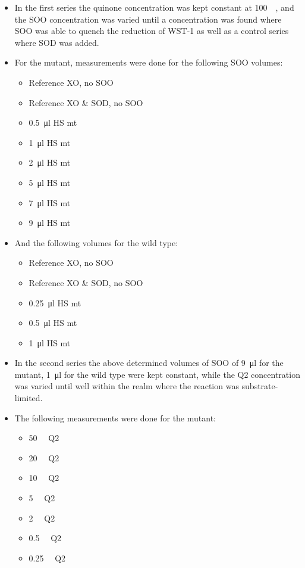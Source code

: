 \begin{itemize}
	\item In the first series the quinone concentration was kept constant
		at \SI{100}{\micro\Molar}, and the SOO concentration was varied
		until a concentration was found where SOO was able to quench
		the reduction of WST-1 as well as a control series where SOD
		was added.
	\item For the mutant, measurements were done for the following SOO
		volumes:
		\begin{itemize}
			\item Reference XO, no SOO
			\item Reference XO \& SOD, no SOO
			\item \SI{0.5}{\ul} HS mt
			\item \SI{1}{\ul} HS mt
			\item \SI{2}{\ul} HS mt
			\item \SI{5}{\ul} HS mt
			\item \SI{7}{\ul} HS mt
			\item \SI{9}{\ul} HS mt
		\end{itemize}
	\item And the following volumes for the wild type:
		\begin{itemize}
			\item Reference XO, no SOO
			\item Reference XO \& SOD, no SOO
			\item \SI{0.25}{\ul} HS mt
			\item \SI{0.5}{\ul} HS mt
			\item \SI{1}{\ul} HS mt
		\end{itemize}
	\item In the second series the above determined volumes of SOO of
		\SI{9}{\ul} for the mutant, \SI{1}{\ul} for the wild type were
		kept constant, while the Q2 concentration was varied until well
		within the realm where the reaction was substrate-limited.
	\item The following measurements were done for the mutant:
		\begin{itemize}
			\item \SI{50}{\micro\Molar} Q2
			\item \SI{20}{\micro\Molar} Q2
			\item \SI{10}{\micro\Molar} Q2
			\item \SI{5}{\micro\Molar} Q2
			\item \SI{2}{\micro\Molar} Q2
			\item \SI{0.5}{\micro\Molar} Q2
			\item \SI{0.25}{\micro\Molar} Q2

\end{itemize}
\end{itemize}
